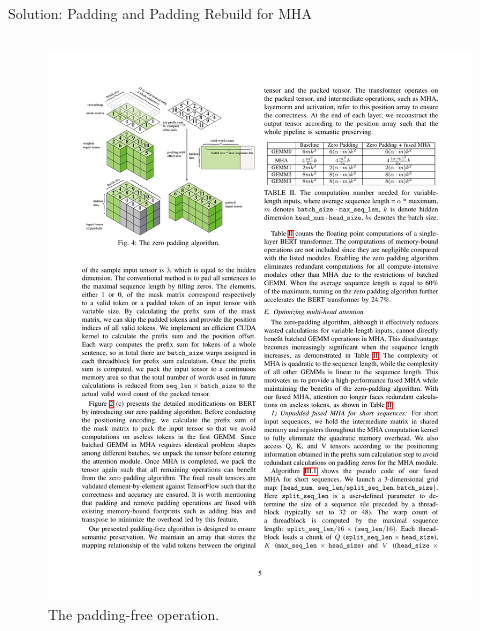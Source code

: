 \begin{frame}{Solution: Padding and Padding Rebuild for MHA}
\begin{columns}[c]
    \begin{column}{.5\textwidth}
        \begin{figure}
            \centering
            \includegraphics[width=1.\textwidth]{./images/zero-padding-algorithm.pdf}
            \caption{The padding-free operation.}
        \end{figure}  
    \end{column}
\end{columns}
\end{frame}

